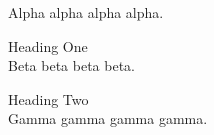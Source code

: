 \documentclass[11pt]{article}
\begin{document}
Alpha alpha alpha alpha.

Heading One\\[-6pt]

Beta beta beta beta.

Heading Two\\[-6pt]

Gamma gamma gamma gamma.
\end{document}
